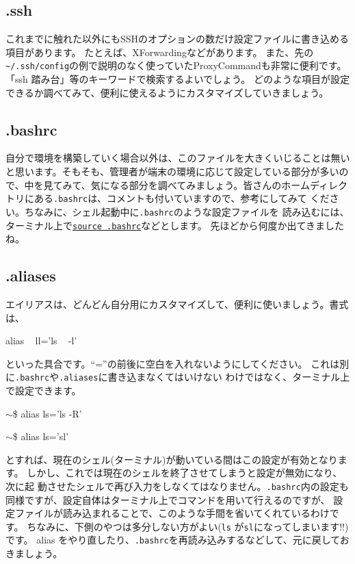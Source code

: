 \documentclass[a4j]{ltjsreport}
\begin{document}
    \subsection{.ssh}
    これまでに触れた以外にもSSHのオプションの数だけ設定ファイルに書き込める項目があります。
    たとえば、XForwardingなどがあります。
    また、先の\verb|~/.ssh/config|の例で説明のなく使っていたProxyCommandも非常に便利です。
    「ssh 踏み台」等のキーワードで検索するよいでしょう。
    どのような項目が設定できるか調べてみて、便利に使えるようにカスタマイズしていきましょう。

    \subsection{.bashrc}
    自分で環境を構築していく場合以外は、このファイルを大きくいじることは無い
    と思います。そもそも、管理者が端末の環境に応じて設定している部分が多いの
    で、中を見てみて、気になる部分を調べてみましょう。皆さんのホームディレク
    トリにある\verb+.bashrc+は、コメントも付いていますので、参考にしてみて
    ください。ちなみに、シェル起動中に\verb+.bashrc+のような設定ファイルを
    読み込むには、ターミナル上で\underline{\texttt{source .bashrc}}などとします。
    先ほどから何度か出てきましたね。

    \subsection{.aliases}
    エイリアスは、どんどん自分用にカスタマイズして、便利に使いましょう。書式
    は、
    \begin{shadebox}
        alias ~ ll='ls ~ -l'
    \end{shadebox}
    といった具合です。``=''の前後に空白を入れないようにしてください。
    これは別に\verb+.bashrc+や\verb+.aliases+に書き込まなくてはいけない
    わけではなく、ターミナル上で設定できます。
    \begin{screen}
        $\sim$\$ alias  ls='ls -R'
    \end{screen}

    \begin{screen}
        $\sim$\$ alias   ls='sl'
    \end{screen}
    とすれば、現在のシェル(ターミナル)が動いている間はこの設定が有効となります。
    しかし、これでは現在のシェルを終了させてしまうと設定が無効になり、次に起
    動させたシェルで再び入力をしなくてはなりません。\verb+.bashrc+内の設定も
    同様ですが、設定自体はターミナル上でコマンドを用いて行えるのですが、
    設定ファイルが読み込まれることで、このような手間を省いてくれているわけです。
    ちなみに、下側のやつは多分しない方がよい(\verb+ls+ が\verb+sl+になってしまいます!!)です。
    alias をやり直したり、\verb+.bashrc+を再読み込みするなどして、元に戻しておきましょう。
\end{document}
